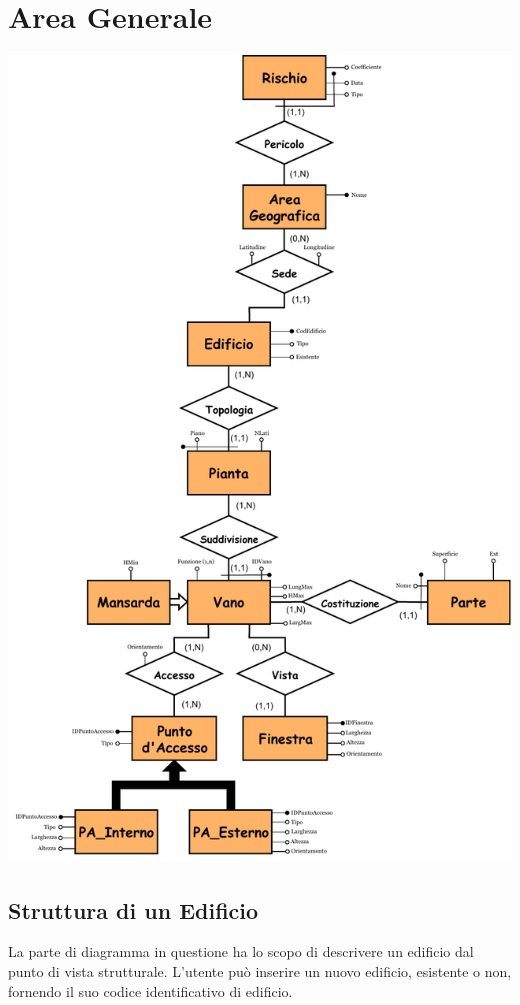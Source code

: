 \documentclass[12pt,a4paper]{report}
\begin{document}
\chapter{Area Generale}
    \begin{center}
        \includegraphics[scale=0.75]{ER_generale.pdf}
    \end{center}
        \section{Struttura di un Edificio}
            
            La parte di diagramma in questione ha lo scopo di descrivere un edificio dal punto di vista 
            strutturale. L'utente può inserire un nuovo edificio, esistente o non, fornendo il suo codice
            identificativo di edificio.
\end{document}
